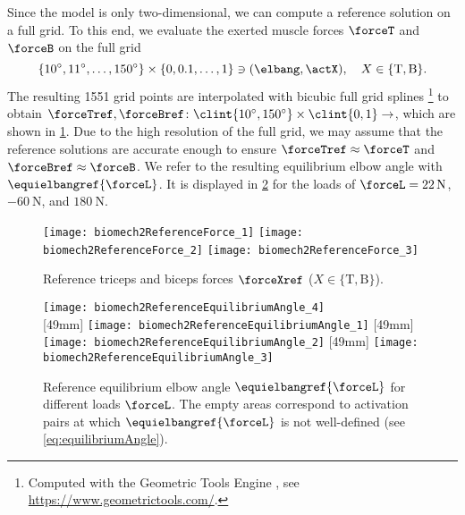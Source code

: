 Since the model is only two-dimensional, we can compute a reference solution
on a full grid.
To this end, we evaluate the exerted muscle forces $\forceT$ and $\forceB$ on
the full grid
\begin{equation}
  \{\ang{10}, \ang{11}, \dotsc, \ang{150}\} \times \{0, 0.1, \dotsc, 1\}
  \ni (\elbang, \actX),\quad
  X \in \{\mathrm{T}, \mathrm{B}\}.
\end{equation}
The resulting \num{1551} grid points
are interpolated with bicubic full grid splines%
\footnote{%
  Computed with the Geometric Tools Engine \cite{Schneider03Geometric},
  see \url{https://www.geometrictools.com/}.%
}
to obtain 
$\forceTref, \forceBref\colon
\clint{\ang{10}, \ang{150}} \times \clint{0, 1} \to \real$,
which are shown in \cref{fig:biomech2ReferenceForce}.
Due to the high resolution of the full grid,
we may assume that the reference solutions are accurate enough
to ensure $\forceTref \approx \forceT$ and $\forceBref \approx \forceB$.
We refer to the resulting equilibrium elbow angle
with $\equielbangref{\forceL}$.
It is displayed in
\cref{fig:biomech2ReferenceEquilibriumAngle}
for the loads of $\forceL = \SI{22}{\newton}$,
$\SI{-60}{\newton}$, and $\SI{180}{\newton}$.

\begin{figure}
  \texttt{[image: biomech2ReferenceForce\_1]}%
  \;\;%
  \texttt{[image: biomech2ReferenceForce\_2]}%
  \hfill%
  \rlap{\raisebox{53mm}{\;$\forceXref$ [\si{\kilo\newton}]}}%
  \texttt{[image: biomech2ReferenceForce\_3]}%
  \caption[Reference triceps and biceps forces]{%
    Reference triceps and biceps forces $\forceXref$
    ($X \in \{\mathrm{T}, \mathrm{B}\}$).%
  }%
  \label{fig:biomech2ReferenceForce}%
\end{figure}

\begin{figure}
  \texttt{[image: biomech2ReferenceEquilibriumAngle\_4]}%
  \\[2mm]%
  [49mm]{%
    \texttt{[image: biomech2ReferenceEquilibriumAngle\_1]}%
  }%
  \hfill%
  [49mm]{%
    \texttt{[image: biomech2ReferenceEquilibriumAngle\_2]}%
  }%
  \hfill%
  [49mm]{%
    \texttt{[image: biomech2ReferenceEquilibriumAngle\_3]}%
  }%
  \caption[Reference equilibrium elbow angle]{%
    Reference equilibrium elbow angle $\equielbangref{\forceL}$
    for different loads $\forceL$.
    The empty areas correspond to activation pairs
    at which $\equielbangref{\forceL}$ is not well-defined
    (see \cref{eq:equilibriumAngle}).%
  }%
  \label{fig:biomech2ReferenceEquilibriumAngle}%
\end{figure}

